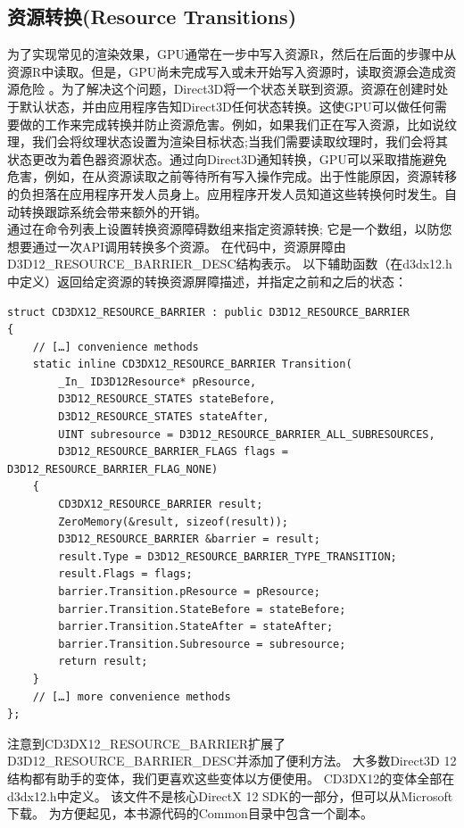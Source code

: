 \documentclass[11pt,a4paper,oldfontcommands]{memoir}
\begin{document}
{\subsection{资源转换(Resource Transitions)}
\begin{flushleft}
为了实现常见的渲染效果，GPU通常在一步中写入资源R，然后在后面的步骤中从资源R中读取。但是，GPU尚未完成写入或未开始写入资源时，读取资源会造成资源危险 。为了解决这个问题，Direct3D将一个状态关联到资源。资源在创建时处于默认状态，并由应用程序告知Direct3D任何状态转换。这使GPU可以做任何需要做的工作来完成转换并防止资源危害。例如，如果我们正在写入资源，比如说纹理，我们会将纹理状态设置为渲染目标状态;当我们需要读取纹理时，我们会将其状态更改为着色器资源状态。通过向Direct3D通知转换，GPU可以采取措施避免危害，例如，在从资源读取之前等待所有写入操作完成。出于性能原因，资源转移的负担落在应用程序开发人员身上。应用程序开发人员知道这些转换何时发生。自动转换跟踪系统会带来额外的开销。\\
通过在命令列表上设置转换资源障碍数组来指定资源转换; 它是一个数组，以防您想要通过一次API调用转换多个资源。 在代码中，资源屏障由D3D12\_RESOURCE\_BARRIER\_DESC结构表示。 以下辅助函数（在d3dx12.h中定义）返回给定资源的转换资源屏障描述，并指定之前和之后的状态：\\
\begin{lstlisting}
struct CD3DX12_RESOURCE_BARRIER : public D3D12_RESOURCE_BARRIER
{
    // […] convenience methods
    static inline CD3DX12_RESOURCE_BARRIER Transition(
        _In_ ID3D12Resource* pResource,
        D3D12_RESOURCE_STATES stateBefore,
        D3D12_RESOURCE_STATES stateAfter,
        UINT subresource = D3D12_RESOURCE_BARRIER_ALL_SUBRESOURCES,
        D3D12_RESOURCE_BARRIER_FLAGS flags = D3D12_RESOURCE_BARRIER_FLAG_NONE)
    {
        CD3DX12_RESOURCE_BARRIER result;
        ZeroMemory(&result, sizeof(result));
        D3D12_RESOURCE_BARRIER &barrier = result;
        result.Type = D3D12_RESOURCE_BARRIER_TYPE_TRANSITION;
        result.Flags = flags;
        barrier.Transition.pResource = pResource;
        barrier.Transition.StateBefore = stateBefore;
        barrier.Transition.StateAfter = stateAfter;
        barrier.Transition.Subresource = subresource;
        return result;
    }
    // […] more convenience methods
};
\end{lstlisting}
注意到CD3DX12\_RESOURCE\_BARRIER扩展了D3D12\_RESOURCE\_BARRIER\_DESC并添加了便利方法。 大多数Direct3D 12结构都有助手的变体，我们更喜欢这些变体以方便使用。 CD3DX12的变体全部在d3dx12.h中定义。 该文件不是核心DirectX 12 SDK的一部分，但可以从Microsoft下载。 为方便起见，本书源代码的Common目录中包含一个副本。\\

\end{flushleft}}
\end{document}
